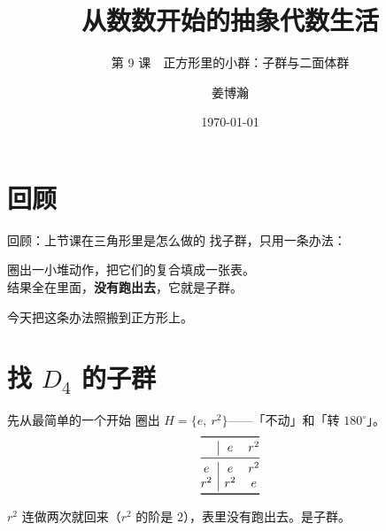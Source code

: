 \documentclass[10pt]{beamer}
\title{从数数开始的抽象代数生活}
\subtitle{第 9 课　正方形里的小群：子群与二面体群}
\author{姜博瀚}
\institute{厦门大学附属实验中学}
\date{\today}
\begin{document}
\begin{frame}
  \titlepage
\end{frame}

\section{回顾}

\begin{frame}{回顾：上节课在三角形里是怎么做的}
  找子群，只用一条办法：
  \begin{block}{}
    圈出一小堆动作，把它们的复合填成一张表。\\[2pt]
    结果全在里面，\textbf{没有跑出去}，它就是子群。
  \end{block}
  \pause
  \begin{center}
    {\large 今天把这条办法照搬到正方形上。}
  \end{center}
\end{frame}

\section{找 \(D_4\) 的子群}

\begin{frame}{先从最简单的一个开始}
  圈出 \(H=\{e,\ r^2\}\)——「不动」和「转 \(180^\circ\)」。
  \pause
  \[
  \begin{array}{@{}c|cc@{}}
    \toprule
    & e & r^2 \\
    \midrule
    e & e & r^2 \\
    r^2 & r^2 & e \\
    \bottomrule
  \end{array}
  \]
  \pause
  \begin{center}
    \(r^2\) 连做两次就回来（\(r^2\) 的阶是 \(2\)），表里没有跑出去。\quad 是子群。
  \end{center}
\end{frame}
\end{document}
